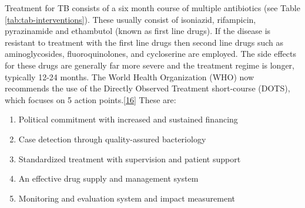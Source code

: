 \documentclass[11pt,twoside]{bristolthesis}
\providecommand{\tightlist}{%
  \setlength{\itemsep}{0pt}\setlength{\parskip}{0pt}}
\begin{document}
  Treatment for TB consists of a six month course of multiple antibiotics (see Table \ref{tab:tab-interventions}). These usually consist of isoniazid, rifampicin, pyrazinamide and ethambutol (known as first line drugs). If the disease is resistant to treatment with the first line drugs then second line drugs such as aminoglycosides, fluoroquinolones, and cycloserine are employed. The side effects for these drugs are generally far more severe and the treatment regime is longer, typically 12-24 months. The World Health Organization (WHO) now recommends the use of the Directly Observed Treatment short-course (DOTS), which focuses on 5 action points.{[}\protect\hyperlink{ref-WHOTB2016}{16}{]} These are:
  \begin{enumerate}
  \def\labelenumi{\arabic{enumi}.}
  \tightlist
  \item
    Political commitment with increased and sustained financing
  \item
    Case detection through quality-assured bacteriology
  \item
    Standardized treatment with supervision and patient support
  \item
    An effective drug supply and management system
  \item
    Monitoring and evaluation system and impact measurement
  \end{enumerate}
\end{document}
